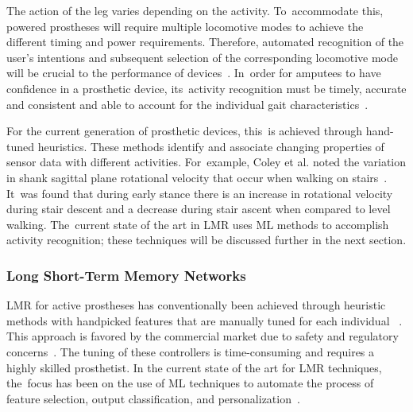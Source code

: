 The action of the leg varies depending on the activity. To~accommodate this, powered prostheses will require multiple locomotive modes to achieve the different timing and power requirements. Therefore, automated recognition of the user's intentions and subsequent selection of the corresponding locomotive mode will be crucial to the performance of devices~\cite{Tucker2015, Windrich2016, Zhang2015}. In~order for amputees to have confidence in a prosthetic device, its~activity recognition must be timely, accurate and consistent and able to account for the individual gait characteristics~\cite{Pedroli2019, Sinha2011, Ponce2016}.

For the current generation of prosthetic devices, this~is achieved through hand-tuned heuristics. These methods identify and associate changing properties of sensor data with different activities. For~example, Coley et al. noted the variation in shank sagittal plane rotational velocity that occur when walking on stairs~\cite{Coley2005}. It~was found that during early stance there is an increase in rotational velocity during stair descent and a decrease during stair ascent when compared to level walking. The~current state of the art in LMR uses ML methods to accomplish activity recognition; these techniques will be discussed further in the next section.

\subsubsection{Long Short-Term Memory Networks}
\label{sec:lstm_therory}
LMR for active prostheses has conventionally been achieved through heuristic methods with handpicked features that are manually tuned for each individual ~\cite{Maqbool2017, Xu2018}. This approach is favored by the commercial market due to safety and regulatory concerns~\cite{Fluit2020}.  The tuning of these controllers is time-consuming and requires a highly skilled prosthetist. In the current state of the art for LMR techniques, the~focus has been on the use of ML techniques to automate the process of feature selection, output classification, and personalization~\cite{Labarriere2020}.

